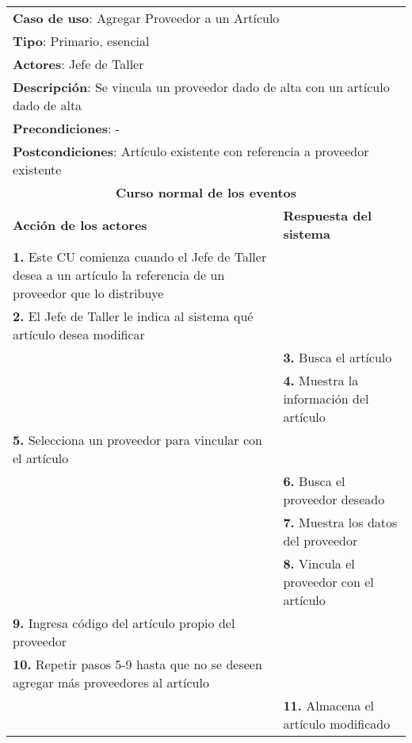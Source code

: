 


	\begin{longtable}{ |p{8cm}|p{8cm}| }
		\hline
		\multicolumn{2}{|p{16cm}|}{\textbf{Caso de uso}: Agregar Proveedor a un Artículo}\\
		\multicolumn{2}{|p{16cm}|}{\textbf{Tipo}: Primario, esencial}\\
		\multicolumn{2}{|p{16cm}|}{\textbf{Actores}: Jefe de Taller}\\
		\multicolumn{2}{|p{16cm}|}{\textbf{Descripción}: Se vincula un proveedor dado de alta con un artículo dado de alta}\\
		\multicolumn{2}{|p{16cm}|}{\textbf{Precondiciones}: -}\\
		\multicolumn{2}{|p{16cm}|}{\textbf{Postcondiciones}: Artículo existente con referencia a proveedor existente}\\
		\hline
		\multicolumn{2}{|c|}{\textbf{Curso normal de los eventos}}\\
		\hline
		\textbf{Acción de los actores} & \textbf{Respuesta del sistema}\\
		\hline
			\textbf{1. }Este CU comienza cuando el Jefe de Taller desea a un artículo la referencia de un proveedor que lo distribuye& \\
			\hline
			\textbf{2. }El Jefe de Taller le indica al sistema qué artículo desea modificar & \\
			\hline
			& \textbf{3. }Busca el artículo \\
			\hline
			& \textbf{4. }Muestra la información del artículo \\
			\hline
			\textbf{5. }Selecciona un proveedor para vincular con el artículo &\\
			\hline
			& \textbf{6. }Busca el proveedor deseado \\
			\hline
			& \textbf{7. }Muestra los datos del proveedor \\
			\hline
			& \textbf{8. }Vincula el proveedor con el artículo\\
			\hline
			\textbf{9. }Ingresa código del artículo propio del proveedor & \\
			\hline
			\textbf{10. }Repetir pasos 5-9 hasta que no se deseen agregar más proveedores al artículo &  \\
			\hline
			& \textbf{11. }Almacena el artículo modificado \\
			\hline

\end{longtable}
